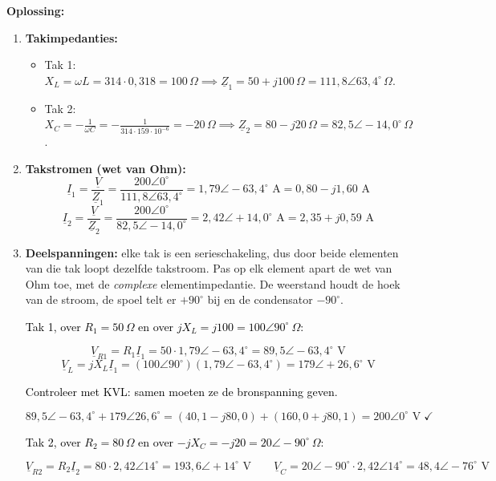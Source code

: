 \documentclass[a4paper,11pt]{article}
\newcommand{\stapreden}[1]{\par\vspace{1.4mm}\noindent\textcolor{black}{#1}\par\vspace{-2mm}}
\begin{document}
\begin{oefening}
    \textbf{Oplossing:}
    \begin{enumerate}
        \item \textbf{Takimpedanties:}
              \begin{itemize}
                  \item Tak 1: $X_L = \omega L = 314 \cdot 0{,}318 = 100\,\Omega \implies \underline{Z}_1 = 50 + j100\,\Omega = 111{,}8\angle 63{,}4^\circ\,\Omega$.
                  \item Tak 2: $X_C = -\frac{1}{\omega C} = -\frac{1}{314 \cdot 159 \cdot 10^{-6}} = -20\,\Omega \implies \underline{Z}_2 = 80 - j20\,\Omega = 82{,}5\angle -14{,}0^\circ\,\Omega$.
              \end{itemize}
        \item \textbf{Takstromen (wet van Ohm):}
              \[\underline{I}_1 = \frac{\underline{V}}{\underline{Z}_1} = \frac{200\angle 0^\circ}{111{,}8\angle 63{,}4^\circ} = 1{,}79\angle -63{,}4^\circ\text{ A} = 0{,}80 - j1{,}60\text{ A}\]
              \[\underline{I}_2 = \frac{\underline{V}}{\underline{Z}_2} = \frac{200\angle 0^\circ}{82{,}5\angle -14{,}0^\circ} = 2{,}42\angle +14{,}0^\circ\text{ A} = 2{,}35 + j0{,}59\text{ A}\]
        \item \textbf{Deelspanningen:} elke tak is een serieschakeling, dus door beide elementen
              van die tak loopt dezelfde takstroom. Pas op elk element apart de wet van Ohm toe,
              met de \emph{complexe} elementimpedantie. De weerstand houdt de hoek van de stroom,
              de spoel telt er $+90^\circ$ bij en de condensator $-90^\circ$.

              \stapreden{Tak 1, over $R_1 = 50\,\Omega$ en over $jX_L = j100 = 100\angle 90^\circ\ \Omega$:}
              \[\underline{V}_{R1} = R_1\underline{I}_1 = 50 \cdot 1{,}79\angle -63{,}4^\circ
                  = 89{,}5\angle -63{,}4^\circ\text{ V}\]
              \[\underline{V}_L = jX_L\underline{I}_1 = (100\angle 90^\circ)(1{,}79\angle -63{,}4^\circ)
                  = 179\angle +26{,}6^\circ\text{ V}\]

              \stapreden{Controleer met KVL: samen moeten ze de bronspanning geven.}
              \[89{,}5\angle -63{,}4^\circ + 179\angle 26{,}6^\circ
                  = (40{,}1 - j80{,}0) + (160{,}0 + j80{,}1) = 200\angle 0^\circ\text{ V}\;\checkmark\]

              \stapreden{Tak 2, over $R_2 = 80\,\Omega$ en over $-jX_C = -j20 = 20\angle -90^\circ\ \Omega$:}
              \[\underline{V}_{R2} = R_2\underline{I}_2 = 80 \cdot 2{,}42\angle 14^\circ
                  = 193{,}6\angle +14^\circ\text{ V}
                  \qquad
                  \underline{V}_C = 20\angle -90^\circ \cdot 2{,}42\angle 14^\circ
                  = 48{,}4\angle -76^\circ\text{ V}\]


\end{enumerate}
\end{oefening}
\end{document}
